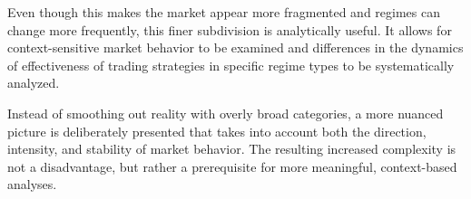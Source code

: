 Even though this makes the market appear more fragmented and regimes can change more frequently, this finer subdivision is analytically useful.
It allows for context-sensitive market behavior to be examined and differences in the dynamics of effectiveness of trading strategies in specific regime types to be systematically analyzed.

Instead of smoothing out reality with overly broad categories, a more nuanced picture is deliberately presented that takes into account both the direction, intensity, and stability of market behavior.
The resulting increased complexity is not a disadvantage, but rather a prerequisite for more meaningful, context-based analyses.
